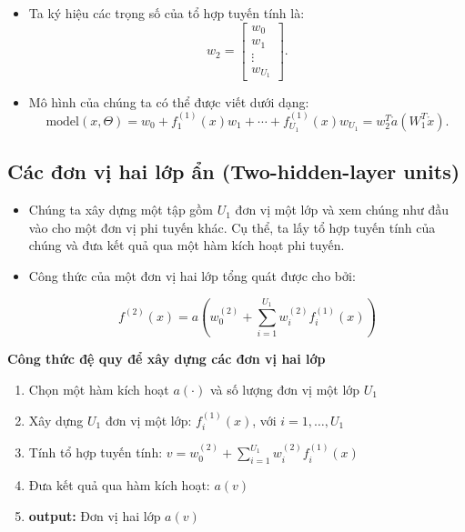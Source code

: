 \documentclass{book}
\begin{document}
\begin{itemize}
        \item Ta ký hiệu các trọng số của tổ hợp tuyến tính là:
        \[
        w_2 =
        \begin{bmatrix}
        w_0 \\
        w_1 \\
        \vdots \\
        w_{U_1}
        \end{bmatrix}.
        \]
        
        \item Mô hình của chúng ta có thể được viết dưới dạng:
        \[
        \text{model}(x, \Theta) = w_0 + f^{(1)}_1(x) w_1 + \cdots + f^{(1)}_{U_1}(x) w_{U_1} = w_{2}^{T} \mathring{a}\left(W_{1}^{T} \mathring{x}\right).
        \]
    \end{itemize}
    
    \subsection{Các đơn vị hai lớp ẩn (Two-hidden-layer units)}
    \begin{itemize}
        \item Chúng ta xây dựng một tập gồm \( U_1 \) đơn vị một lớp và xem chúng như đầu vào cho một đơn vị phi tuyến khác. Cụ thể, ta lấy tổ hợp tuyến tính của chúng và đưa kết quả qua một hàm kích hoạt phi tuyến.
        \item Công thức của một đơn vị hai lớp tổng quát được cho bởi:

        \[
        f^{(2)}(x) = a\left(w^{(2)}_0 + \sum_{i=1}^{U_1} w^{(2)}_i f^{(1)}_i(x)\right)
        \]
    \end{itemize}
    
    \textbf{Công thức đệ quy để xây dựng các đơn vị hai lớp}

    \begin{enumerate}
        \item Chọn một hàm kích hoạt \( a(\cdot) \) và số lượng đơn vị một lớp \( U_1 \)
        \item Xây dựng \( U_1 \) đơn vị một lớp: \( f^{(1)}_i(x) \), với \( i = 1, \ldots, U_1 \)
        \item Tính tổ hợp tuyến tính: 
        $ v = w^{(2)}_0 + \sum_{i=1}^{U_1} w^{(2)}_i f^{(1)}_i(x) $
        \item Đưa kết quả qua hàm kích hoạt: \( a(v) \)
        \item \textbf{output:} Đơn vị hai lớp \( a(v) \)
    \end{enumerate}
\end{document}

